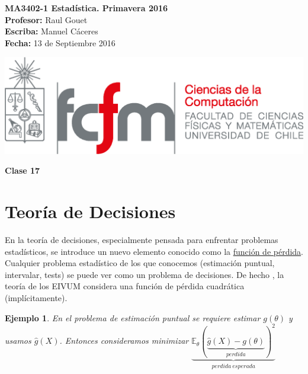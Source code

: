 \documentclass[10pt]{article}
\theoremstyle{plain}
\newtheorem{ej}{Ejemplo}
\theoremstyle{definition}
\newcommand{\catnum}{17} %
\newcommand{\fecha}{13 de Septiembre 2016 }
\begin{document}
\vspace*{-1.2 cm}
\begin{minipage}{0.6\textwidth}
\begin{flushleft}
\hspace*{-0.5cm}\textbf{MA3402-1 Estadística. Primavera 2016}\\
\hspace*{-0.5cm}\textbf{Profesor:} Raul Gouet\\
\hspace*{-0.5cm}\textbf{Escriba:} Manuel Cáceres\\
\hspace*{-0.5cm}\textbf{Fecha:} \fecha
\end{flushleft}
\end{minipage}
\begin{minipage}{0.36\textwidth}
\begin{flushright}
\includegraphics[scale=0.3]{imagenes/fcfm_dcc}
\end{flushright}
\end{minipage}
\bigskip

\begin{center}
\LARGE\textbf{Clase \catnum}
\end{center}
\section{Teoría de Decisiones}
En la teoría de decisiones, especialmente pensada para enfrentar problemas estadísticos, se introduce un nuevo elemento conocido como la \underline{función de pérdida}.\\

Cualquier problema estadístico de los que conocemos (estimación puntual, intervalar, tests) se puede ver como un problema de decisiones. De hecho , la teoría de los EIVUM considera una función de pérdida cuadrática (implícitamente).

\begin{ej} En el problema de estimación puntual se requiere estimar $g(\theta)$ y usamos $\hat{g}(X)$. Entonces consideramos minimizar $\underbrace{\mathbb{E}_{\theta}(\underbrace{\hat{g}(X)-g(\theta)}_{perdida})^2}_{perdida\ esperada}$
\end{ej}
\end{document}
